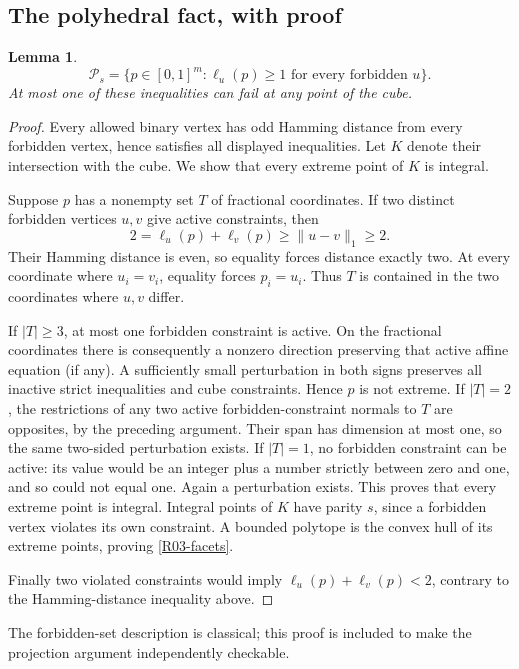 \documentclass[11pt,a4paper]{article}
\newtheorem{lemma}[theorem]{Lemma}
\theoremstyle{definition}\newtheorem{definition}[theorem]{Definition}
\theoremstyle{remark}\newtheorem{remark}[theorem]{Remark}
\numberwithin{equation}{section}
\begin{document}
\subsection{The polyhedral fact, with proof}\label{R03-sec-2}
\begin{lemma}\label{R03-poly}
\begin{equation}\label{R03-facets}
\mathcal P_s=\{p\in[0,1]^m:\ell_u(p)\geq1\text{ for every forbidden }u\}.
\end{equation}
At most one of these inequalities can fail at any point of the cube.
\end{lemma}
\begin{proof}
Every allowed binary vertex has odd Hamming distance from every forbidden vertex, hence satisfies all displayed inequalities. Let $K$ denote their intersection with the cube. We show that every extreme point of $K$ is integral.

Suppose $p$ has a nonempty set $T$ of fractional coordinates. If two distinct forbidden vertices $u,v$ give active constraints, then
\[
2=\ell_u(p)+\ell_v(p)\geq\|u-v\|_1\geq2.
\]
Their Hamming distance is even, so equality forces distance exactly two. At every coordinate where $u_i=v_i$, equality forces $p_i=u_i$. Thus $T$ is contained in the two coordinates where $u,v$ differ.

If $|T|\geq3$, at most one forbidden constraint is active. On the fractional coordinates there is consequently a nonzero direction preserving that active affine equation (if any). A sufficiently small perturbation in both signs preserves all inactive strict inequalities and cube constraints. Hence $p$ is not extreme.
If $|T|=2$, the restrictions of any two active forbidden-constraint normals to $T$ are opposites, by the preceding argument. Their span has dimension at most one, so the same two-sided perturbation exists. If $|T|=1$, no forbidden constraint can be active: its value would be an integer plus a number strictly between zero and one, and so could not equal one. Again a perturbation exists. This proves that every extreme point is integral. Integral points of $K$ have parity $s$, since a forbidden vertex violates its own constraint. A bounded polytope is the convex hull of its extreme points, proving \eqref{R03-facets}.

Finally two violated constraints would imply $\ell_u(p)+\ell_v(p)<2$, contrary to the Hamming-distance inequality above.
\end{proof}
The forbidden-set description is classical; this proof is included to make the projection argument independently checkable.
\end{document}
